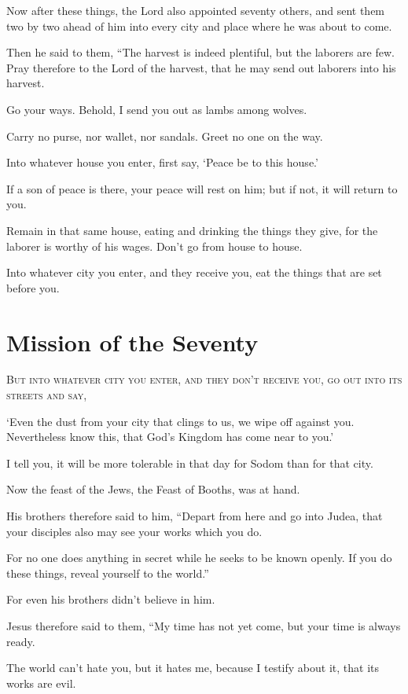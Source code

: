 Now after these things, the Lord also appointed seventy others, and sent them two by two ahead of him into every city and place where he was about to come.

Then he said to them, “The harvest is indeed plentiful, but the laborers are few. Pray therefore to the Lord of the harvest, that he may send out laborers into his harvest.

Go your ways. Behold, I send you out as lambs among wolves.

Carry no purse, nor wallet, nor sandals. Greet no one on the way.

Into whatever house you enter, first say, ‘Peace be to this house.’

If a son of peace is there, your peace will rest on him; but if not, it will return to you.

Remain in that same house, eating and drinking the things they give, for the laborer is worthy of his wages. Don’t go from house to house.

Into whatever city you enter, and they receive you, eat the things that are set before you.


\clearpage \section*{Mission of the Seventy}

\lettrine{B}{ut into whatever city you enter, and they don’t receive you, go out into its streets and say,}

‘Even the dust from your city that clings to us, we wipe off against you. Nevertheless know this, that God’s Kingdom has come near to you.’

I tell you, it will be more tolerable in that day for Sodom than for that city.

Now the feast of the Jews, the Feast of Booths, was at hand.

His brothers therefore said to him, “Depart from here and go into Judea, that your disciples also may see your works which you do.

For no one does anything in secret while he seeks to be known openly. If you do these things, reveal yourself to the world.”

For even his brothers didn’t believe in him.

Jesus therefore said to them, “My time has not yet come, but your time is always ready.

The world can’t hate you, but it hates me, because I testify about it, that its works are evil.

